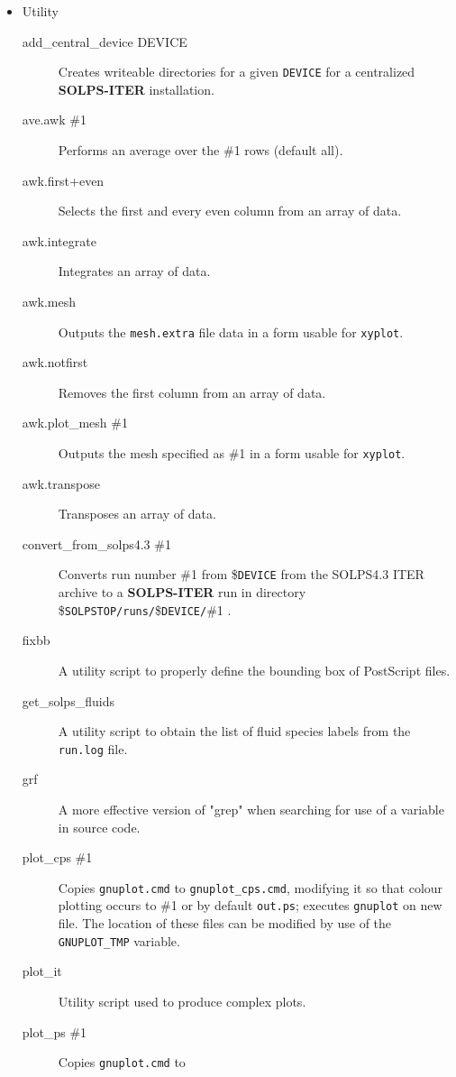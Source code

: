 \documentclass[a4paper,10pt]{report}
\newcommand\SOLPSITER{{\bf SOLPS-ITER} }
\begin{document}
\begin{itemize}
the {\tt SOLPS\_FLUIDS} or {\tt NREG} files is not found, the necessary information is
extracted from the {\tt run.log} file.
\item Utility
  \begin{description}
  \item[add\_central\_device DEVICE] Creates writeable directories for a given {\tt DEVICE} for a centralized \SOLPSITER installation.
  \item[ave.awk \#1] Performs an average over the \#1 rows (default all).
  \item[awk.first+even] Selects the first and every even column from an array of data.
  \item[awk.integrate] Integrates an array of data.
  \item[awk.mesh] Outputs the {\tt mesh.extra} file data in a form usable for {\tt xyplot}.
  \item[awk.notfirst] Removes the first column from an array of data.
  \item[awk.plot\_mesh \#1] Outputs the mesh specified as \#1 in a form usable for {\tt xyplot}.
  \item[awk.transpose] Transposes an array of data.
  \item[convert\_from\_solps4.3 \#1] Converts run number \#1 from \${\tt DEVICE} from the SOLPS4.3 ITER archive to a \SOLPSITER run in directory \${\tt SOLPSTOP/runs/}\${\tt DEVICE/}\#1 .
  \item[fixbb] A utility script to properly define the bounding box of PostScript files.
  \item[get\_solps\_fluids] A utility script to obtain the list of fluid species labels from the {\tt run.log} file.
  \item[grf] A more effective version of "grep" when searching for use of a variable in source code.
  \item[plot\_cps \#1] Copies {\tt gnuplot.cmd} to
    {\tt gnuplot\_cps.cmd}, modifying it so that colour plotting occurs to \#1
    or by default {\tt out.ps}; executes {\tt gnuplot} on new file.
    The location of these files can be modified by use of the {\tt GNUPLOT\_TMP} variable.
  \item[plot\_it] Utility script used to produce complex plots.
  \item[plot\_ps \#1] Copies {\tt gnuplot.cmd} to

\end{description}
\end{itemize}
\end{document}

